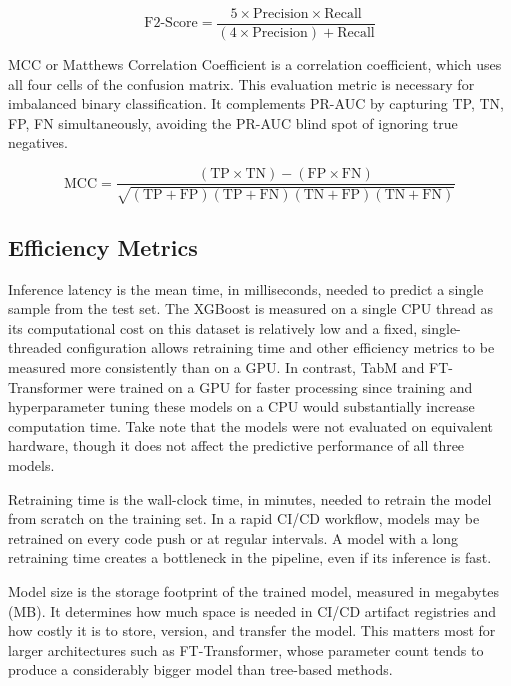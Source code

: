 \begin{equation}
  \text{F2-Score} = \frac{5 \times \text{Precision} \times \text{Recall}}{(4 \times \text{Precision}) + \text{Recall}}
  \label{eq:f2}
\end{equation}

MCC or Matthews Correlation Coefficient is a correlation coefficient, which uses all four cells of the confusion matrix. This evaluation metric is necessary for imbalanced binary classification. It complements PR-AUC by capturing TP, TN, FP, FN simultaneously, avoiding the PR-AUC blind spot of ignoring true negatives.

\begin{equation}
  \text{MCC} = \frac{(\text{TP} \times \text{TN}) - (\text{FP} \times \text{FN})}{\sqrt{(\text{TP} + \text{FP})(\text{TP} + \text{FN})(\text{TN} + \text{FP})(\text{TN} + \text{FN})}}
  \label{eq:mcc}
\end{equation}

 \subsection{Efficiency Metrics}
Inference latency is the mean time, in milliseconds, needed to predict a single sample from the test set. The XGBoost is measured on a single CPU thread as its computational cost on this dataset is relatively low and a fixed, single-threaded configuration allows retraining time and other efficiency metrics to be measured more consistently than on a GPU. In contrast, TabM and FT-Transformer were trained on a GPU for faster processing since training and hyperparameter tuning these models on a CPU would substantially increase computation time. Take note that the models were not evaluated on equivalent hardware, though it does not affect the predictive performance of all three models.

Retraining time is the wall-clock time, in minutes, needed to retrain the model from scratch on the training set. In a rapid CI/CD workflow, models may be retrained on every code push or at regular intervals. A model with a long retraining time creates a bottleneck in the pipeline, even if its inference is fast.

Model size is the storage footprint of the trained model, measured in megabytes (MB). It determines how much space is needed in CI/CD artifact registries and how costly it is to store, version, and transfer the model. This matters most for larger architectures such as FT-Transformer, whose parameter count tends to produce a considerably bigger model than tree-based methods.

